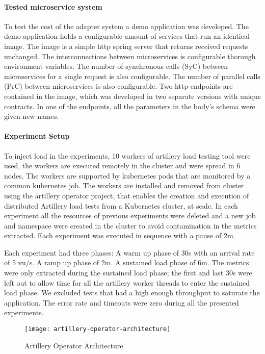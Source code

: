 \paragraph{Tested microservice system }

To test the cost of the adapter system a demo application was developed.
The demo application holds a configurable amount of services that run an identical image.
The image is a simple http spring server that returns received requests unchanged.
The interconnections between microservices is configurable thorough environment variables.
The number of synchronous calls (SyC) between microservices for a single request is also configurable.
The number of parallel calls (PrC) between microservices is also configurable.
Two http endpoints are contained in the image, which was developed in two separate versions with unique contracts.
In one of the endpoints, all the parameters in the body's schema were given new names.

\paragraph{Experiment Setup}

To inject load in the experiments, 10 workers of artillery load testing tool were used,
the workers are executed remotely in the cluster and were spread in 6 nodes.
The workers are supported by kubernetes pods that are monitored by a common kubernetes job.
The workers are installed and removed from cluster using the artillery operator project, that enables
the creation and execution of distributed Artillery load tests from a Kubernetes cluster, at scale.
In each experiment all the resources of previous experiments were deleted and a new job and namespace were created in the
cluster to avoid contamination in the metrics extracted.
Each experiment was executed in sequence with a pause of 2m.

Each experiment had three phases:
A warm up phase of 30s with an arrival rate of 5 vu/s.
A ramp up phase of 2m.
A sustained load phase of 6m.
The metrics were only extracted during the sustained load phase;
the first and last 30s were left out to allow time for all the artillery worker threads to enter the sustained load phase.
We excluded tests that had a high enough throughput to saturate the application.
The error rate and timeouts were zero during all the presented experiments.

\begin{figure}[htbp]
    \centering
    \texttt{[image: artillery-operator-architecture]}
    \caption{Artillery Operator Architecture}
    \label{fig:gantt}
\end{figure}

